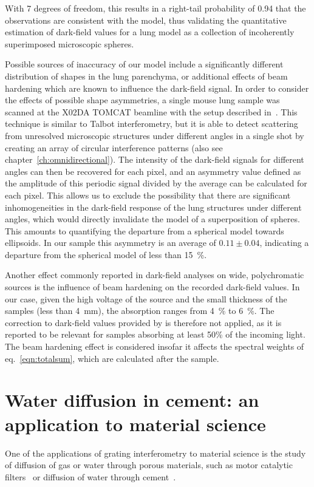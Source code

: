 With 7 degrees of freedom, this results in a right-tail probability of 0.94 that the 
observations are consistent with the model, thus validating the quantitative estimation of
dark-field values for a lung model as a collection of incoherently
superimposed microscopic spheres.

Possible sources of inaccuracy of our model include a significantly
different distribution of shapes in the lung parenchyma, or additional
effects of beam hardening which are known to influence the dark-field
signal. In order to consider the effects of possible shape asymmetries, a
single mouse lung sample was scanned at the X02DA TOMCAT beamline with the
setup described in~\cite{PhysRevLett.116.093902}. This
technique is similar to Talbot interferometry, but it is able to detect
scattering from unresolved microscopic structures under different angles in
a single shot by
creating an array of circular interference patterns (also see
chapter~\ref{ch:omnidirectional}). The intensity of the
dark-field signals for different angles can then be recovered for each
pixel, and an asymmetry value defined as the amplitude of this periodic
signal divided by the average can be calculated for each pixel. This allows
us to exclude the possibility that there are significant inhomogeneities in
the dark-field response of the lung structures under different angles, which
would directly invalidate the model of a superposition of spheres. This
amounts to quantifying the departure from a spherical model towards
ellipsoids. In our sample this asymmetry is an average of $0.11 \pm 0.04$,
indicating a departure from the spherical model of less
than \SI{15}{\percent}.

Another effect commonly reported in dark-field analyses on wide, polychromatic
sources is the influence of beam hardening on the recorded dark-field
values. In our case, given the high voltage of the source and the small
thickness of the samples (less than \SI{4}{\milli\meter}), the absorption
ranges from \SI{4}{\percent} to \SI{6}{\percent}. The correction to
dark-field values provided by \cite{Yashiro:15} is therefore
not applied, as it is reported to be relevant for samples absorbing at least
50\% of the incoming light. The beam hardening effect is considered insofar
it affects the spectral weights of eq.~\ref{eqn:totalsum}, which are calculated
after the sample. 

\section{Water diffusion in cement: an application to material science}
One of the applications of grating interferometry to material science is the
study of diffusion of gas or water through porous materials, such as motor
catalytic filters~\parencite{doi:10.1021/cs3004006} or diffusion of water through cement~\parencite{20.500.11850/268}.

